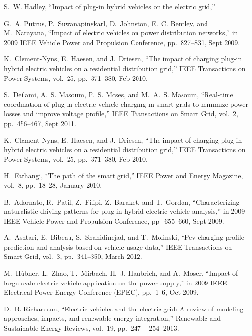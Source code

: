 
S.~W. Hadley, ``Impact of plug-in hybrid vehicles on the electric grid,''

G.~A. Putrus, P.~Suwanapingkarl, D.~Johnston, E.~C. Bentley, and M.~Narayana,
  ``Impact of electric vehicles on power distribution networks,'' in 2009
  IEEE Vehicle Power and Propulsion Conference, pp.~827--831, Sept 2009.

K.~Clement-Nyns, E.~Haesen, and J.~Driesen, ``The impact of charging plug-in
  hybrid electric vehicles on a residential distribution grid,'' IEEE
  Transactions on Power Systems, vol.~25, pp.~371--380, Feb 2010.

S.~Deilami, A.~S. Masoum, P.~S. Moses, and M.~A.~S. Masoum, ``Real-time
  coordination of plug-in electric vehicle charging in smart grids to minimize
  power losses and improve voltage profile,'' IEEE Transactions on Smart
  Grid, vol.~2, pp.~456--467, Sept 2011.

K.~Clement-Nyns, E.~Haesen, and J.~Driesen, ``The impact of charging plug-in
  hybrid electric vehicles on a residential distribution grid,'' IEEE
  Transactions on Power Systems, vol.~25, pp.~371--380, Feb 2010.

H.~Farhangi, ``The path of the smart grid,'' IEEE Power and Energy
  Magazine, vol.~8, pp.~18--28, January 2010.

B.~Adornato, R.~Patil, Z.~Filipi, Z.~Baraket, and T.~Gordon, ``Characterizing
  naturalistic driving patterns for plug-in hybrid electric vehicle analysis,''
  in 2009 IEEE Vehicle Power and Propulsion Conference, pp.~655--660,
  Sept 2009.

A.~Ashtari, E.~Bibeau, S.~Shahidinejad, and T.~Molinski, ``Pev charging profile
  prediction and analysis based on vehicle usage data,'' IEEE Transactions
  on Smart Grid, vol.~3, pp.~341--350, March 2012.

M.~Hübner, L.~Zhao, T.~Mirbach, H.~J. Haubrich, and A.~Moser, ``Impact of
  large-scale electric vehicle application on the power supply,'' in 2009
  IEEE Electrical Power Energy Conference (EPEC), pp.~1--6, Oct 2009.

D.~B. Richardson, ``Electric vehicles and the electric grid: A review of
  modeling approaches, impacts, and renewable energy integration,'' Renewable and Sustainable Energy Reviews, vol.~19, pp.~247 -- 254, 2013.

